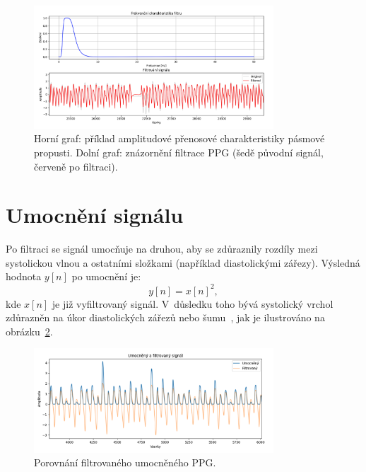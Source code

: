 \begin{figure}[htbp]
	\centering
	\includegraphics[width=0.8\textwidth]{./obrazky/ElgendiBandpass.png}
	\caption[Filtrace PPG signálu]{Horní graf: příklad amplitudové přenosové charakteristiky pásmové propusti. Dolní graf: znázornění filtrace PPG (šedě původní signál, červeně po filtraci).}
	\label{fig:filter-example}
\end{figure}

\section{Umocnění signálu}
Po filtraci se signál umocňuje na druhou, aby se zdůraznily rozdíly mezi systolickou vlnou a ostatními složkami (například diastolickými zářezy).
Výsledná hodnota $y[n]$ po umocnění je:
\begin{equation}
	y[n] = x[n]^2,
	\label{eq:square}
\end{equation}
kde $x[n]$ je již vyfiltrovaný signál.
V~důsledku toho bývá systolický vrchol zdůrazněn na úkor diastolických zářezů nebo šumu~\cite{Elgendi2013}, jak je ilustrováno na obrázku~\ref{fig:squared-signal}.

\begin{figure}[htbp]
	\centering
	\includegraphics[width=0.8\textwidth]{./obrazky/ElgendiUpravenySignal.png}
	\caption[Umocněný a filtrovaný PPG]{Porovnání filtrovaného umocněného PPG.}
	\label{fig:squared-signal}
\end{figure}

